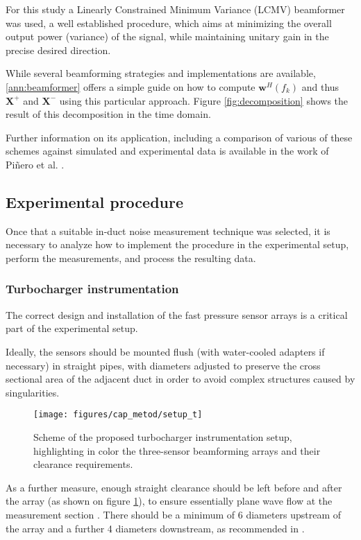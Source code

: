 For this study a Linearly Constrained Minimum Variance (LCMV) beamformer was  used, a well established procedure, which aims at minimizing the overall output power (variance) of the signal, while maintaining unitary gain in the precise desired direction.

While several beamforming strategies and implementations are available, \ref{ann:beamformer} offers a simple guide on how to compute $\mathbf w^H(f_k)$ and thus $\mathbf X^+$ and $\mathbf X^-$ using this particular approach. Figure \ref{fig:decomposition} shows the result of this decomposition in the time domain.

Further information on its application, including a comparison of various of these schemes against simulated and experimental data is available in the work of Piñero et al. \cite{pinero2000estimation}.

\subsection{Experimental procedure}
\label{sec:experimental_procedure}

Once that a suitable in-duct noise measurement technique was  selected, it is necessary to analyze how to implement the procedure in the experimental setup, perform the measurements, and process the resulting data.

\subsubsection{Turbocharger instrumentation}
\label{sub:turbocharger_instrumentation}

The correct design and installation of the fast pressure sensor arrays is a critical part of the experimental setup.

Ideally, the sensors should be mounted flush (with water-cooled adapters if necessary) in straight pipes, with diameters adjusted to preserve the cross sectional area of the adjacent duct in order to avoid complex structures caused by singularities.

\begin{figure}[b!]
\centering
\texttt{[image: figures/cap\_metod/setup\_t]}
\caption{Scheme of the proposed turbocharger instrumentation setup, highlighting in color the three-sensor beamforming arrays and their clearance requirements.}
\label{fig:setup_schem}
\end{figure}

As a further measure, enough straight clearance should be left before and after the array (as shown on figure \ref{fig:setup_schem}), to ensure essentially plane wave flow at the measurement section \cite{holland2000measurement}. There should be a minimum of 6 diameters upstream of the array and a further 4 diameters downstream, as recommended in \cite{torregrosa2005exp}.

